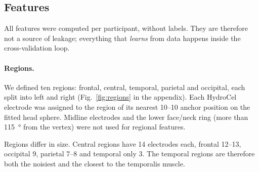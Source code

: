 \subsection{Features}\label{sec:features}
All features were computed per participant, without labels. They are therefore not a source of leakage; everything
that \emph{learns} from data happens inside the cross-validation loop.

\paragraph{Regions.}
We defined ten regions: frontal, central, temporal, parietal and occipital, each split into left and right
(Fig.~\ref{fig:regions} in the appendix). Each HydroCel electrode was assigned to the region of its nearest 10--10
anchor position on the fitted head sphere. Midline electrodes and the lower face/neck ring (more than \SI{115}{\degree}
from the vertex) were not used for regional features.

Regions differ in size. Central regions have 14 electrodes each, frontal 12--13, occipital 9, parietal 7--8 and
temporal only 3. The temporal regions are therefore both the noisiest and the closest to the temporalis muscle.

